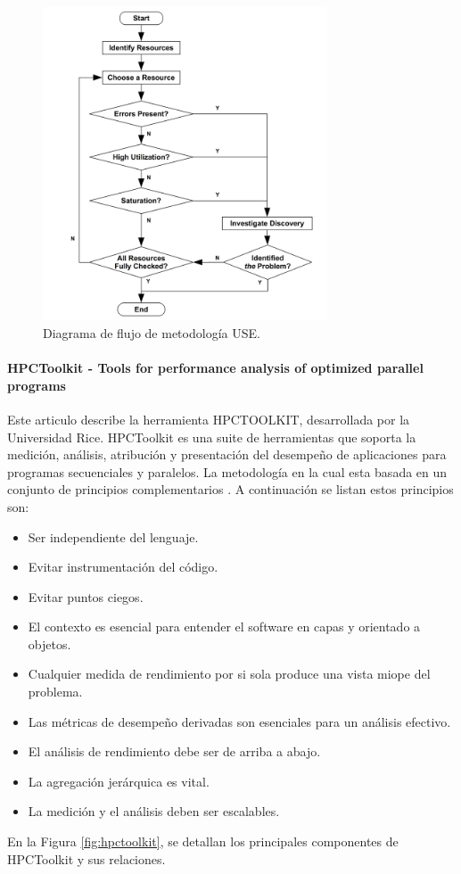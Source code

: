 \begin{figure}[H]
    \centering
    \includegraphics[width=0.75\textwidth]{imagenes/image13.png}
    \caption{Diagrama de flujo de metodología USE.}
    \label{fig:use}
\end{figure}

\paragraph{HPCToolkit - Tools for performance analysis of optimized parallel programs}
Este articulo describe la herramienta HPCTOOLKIT, desarrollada por la Universidad Rice.
HPCToolkit es una suite de herramientas que soporta la medición, análisis, atribución y presentación del desempeño de aplicaciones para programas secuenciales y paralelos.
La metodología en la cual esta basada en un conjunto de principios complementarios
\cite{Adhianto2009}.
A continuación se listan estos principios son:
\begin{itemize}
  \item Ser independiente del lenguaje.
  \item Evitar instrumentación del código.
  \item Evitar puntos ciegos.
  \item El contexto es esencial para entender el software en capas y orientado a objetos.
  \item Cualquier medida de rendimiento por si sola produce una vista miope del problema.
  \item Las métricas de desempeño derivadas son esenciales para un análisis efectivo.
  \item El análisis de rendimiento debe ser de arriba a abajo.
  \item La agregación jerárquica es vital.
  \item La medición y el análisis deben ser escalables.
\end{itemize}
En la Figura \ref{fig:hpctoolkit}, se detallan los principales componentes de HPCToolkit y sus relaciones.

